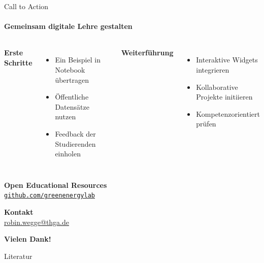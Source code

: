 \documentclass[aspectratio=169,11pt]{beamer}
\newcommand{\thgablue}[1]{\textcolor{thgablue}{#1}}
\newcommand{\thgagreen}[1]{\textcolor{thgagreen}{#1}}
\newcommand{\thgadarkgreen}[1]{\textcolor{thgadarkgreen}{#1}}
\begin{document}
\begin{frame}{Call to Action}
\framesubtitle{Gemeinsam digitale Lehre gestalten}

\vspace{-0.5em}
\begin{center}
\end{center}

\vspace{1em}

\begin{columns}[T,onlytextwidth]
    \textbf{\thgablue{Erste Schritte}}
    \begin{itemize}
        \item Ein Beispiel in Notebook übertragen
        \item Öffentliche Datensätze nutzen
        \item Feedback der Studierenden einholen
    \end{itemize}

    \textbf{\thgagreen{Weiterführung}}
    \begin{itemize}
        \item Interaktive Widgets integrieren
        \item Kollaborative Projekte initiieren
        \item Kompetenzorientiert prüfen
    \end{itemize}
\end{columns}

\end{frame}

\begin{frame}[plain]

\begin{center}
    {\textbf{\thgablue{Open Educational Resources}}}\\[0.5em]
    \href{https://github.com/greenenergylab}{\texttt{github.com/greenenergylab}}
\end{center}

\vspace{1em}

\begin{center}
    {\textbf{Kontakt}}\\
    \href{mailto:robin.wegge@thga.de}{robin.wegge@thga.de}
\end{center}

\vspace{2em}

\begin{center}
    \Huge\textsf{\textbf{Vielen Dank!}}
\end{center}

\end{frame}





\begin{frame}[allowframebreaks]{Literatur}
    \printbibliography
\end{frame}
\end{document}
